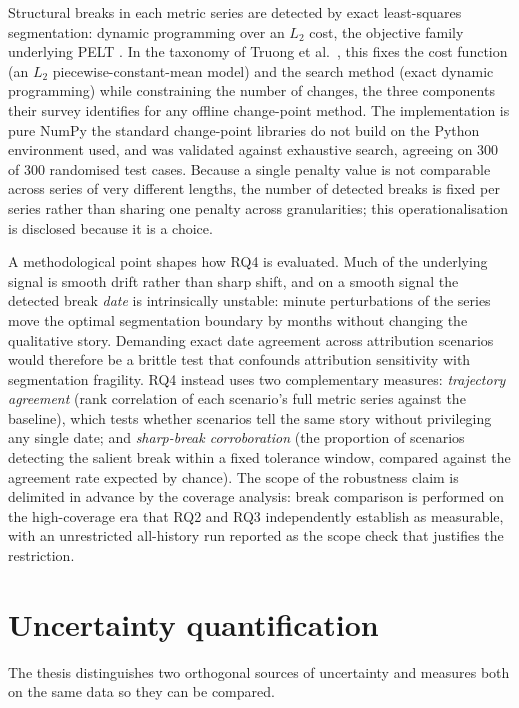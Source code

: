 \documentclass[logo,msc]{infthesis}           %
\begin{document}
Structural breaks in each metric series are detected by exact least-squares
segmentation: dynamic programming over an $L_2$ cost, the objective family
underlying PELT \cite{killick2012pelt}. In the taxonomy of Truong et
al.~\cite{truong2020selective}, this fixes the cost function (an $L_2$
piecewise-constant-mean model) and the search method (exact dynamic
programming) while constraining the number of changes, the three components
their survey identifies for any offline change-point method. The
implementation is pure NumPy 
the standard change-point libraries do not build on the Python environment
used, and was validated against exhaustive search, agreeing on 300 of 300
randomised test cases. Because a single penalty value is not comparable across
series of very different lengths, the number of detected breaks is fixed per
series rather than sharing one penalty across granularities; this
operationalisation is disclosed because it is a choice.
 
A methodological point shapes how RQ4 is evaluated. Much of the underlying
signal is smooth drift rather than sharp shift, and on a smooth signal the
detected break \emph{date} is intrinsically unstable: minute perturbations of
the series move the optimal segmentation boundary by months without changing
the qualitative story. Demanding exact date agreement across attribution
scenarios would therefore be a brittle test that confounds attribution
sensitivity with segmentation fragility. RQ4 instead uses two complementary
measures: \emph{trajectory agreement} (rank correlation of each scenario's
full metric series against the baseline), which tests whether scenarios tell
the same story without privileging any single date; and \emph{sharp-break
corroboration} (the proportion of scenarios detecting the salient break within
a fixed tolerance window, compared against the agreement rate expected by
chance). The scope of the robustness claim is delimited in advance by the
coverage analysis: break comparison is performed on the high-coverage era that
RQ2 and RQ3 independently establish as measurable, with an unrestricted
all-history run reported as the scope check that justifies the restriction.
 
\section{Uncertainty quantification}
\label{sec:uncertainty}
 
The thesis distinguishes two orthogonal sources of uncertainty and measures
both on the same data so they can be compared.
 
\end{document}
